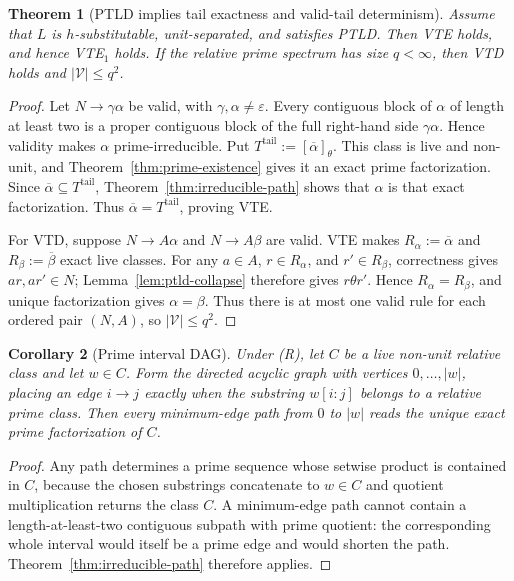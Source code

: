 \documentclass[11pt,a4paper]{article}
\newtheorem{theorem}{Theorem}[section]
\newtheorem{corollary}[theorem]{Corollary}
\newcommand{\eps}{\varepsilon}
\newcommand{\Vcal}{\mathcal V}
\begin{document}
\begin{theorem}[PTLD implies tail exactness and valid-tail determinism]
\label{thm:ptld-vte-vtd}
Assume that $L$ is $h$-substitutable, unit-separated, and satisfies
PTLD.  Then VTE holds, and hence VTE$_1$ holds.  If the relative prime
spectrum has size $q<\infty$, then VTD holds and $|\Vcal|\le q^2$.
\end{theorem}

\begin{proof}
Let $N\to\gamma\alpha$ be valid, with $\gamma,\alpha\ne\eps$.  Every
contiguous block of $\alpha$ of length at least two is a proper
contiguous block of the full right-hand side $\gamma\alpha$.  Hence
validity makes $\alpha$ prime-irreducible.  Put
$T^{\mathrm{tail}}:=[\overline\alpha]_\theta$.  This class is live and
non-unit, and Theorem~\ref{thm:prime-existence} gives it an exact prime
factorization.  Since $\overline\alpha\subseteq T^{\mathrm{tail}}$,
Theorem~\ref{thm:irreducible-path} shows that $\alpha$ is that exact
factorization.  Thus $\overline\alpha=T^{\mathrm{tail}}$, proving VTE.

For VTD, suppose $N\to A\alpha$ and $N\to A\beta$ are valid.  VTE makes $R_\alpha:=\overline\alpha$ and $R_\beta:=\overline\beta$ exact live classes.  For any $a\in A$, $r\in R_\alpha$, and $r'\in R_\beta$, correctness gives $ar,ar'\in N$; Lemma~\ref{lem:ptld-collapse} therefore gives $r\theta r'$.  Hence $R_\alpha=R_\beta$, and unique factorization gives $\alpha=\beta$.  Thus there is at most one valid rule for each ordered pair $(N,A)$, so $|\Vcal|\le q^2$.
\end{proof}

\begin{corollary}[Prime interval DAG]
\label{cor:prime-dag}
Under \textup{(R)}, let $C$ be a live non-unit relative class and let
$w\in C$.  Form the directed acyclic graph with vertices
$0,\ldots,|w|$, placing an edge $i\to j$ exactly when the substring
$w[i:j]$ belongs to a relative prime class.  Then every minimum-edge
path from $0$ to $|w|$ reads the unique exact prime factorization of
$C$.
\end{corollary}

\begin{proof}
Any path determines a prime sequence whose setwise product is contained in $C$, because the chosen substrings concatenate to $w\in C$ and quotient multiplication returns the class $C$.  A minimum-edge path cannot contain a length-at-least-two contiguous subpath with prime quotient: the corresponding whole interval would itself be a prime edge and would shorten the path.  Theorem~\ref{thm:irreducible-path} therefore applies.
\end{proof}
\end{document}
